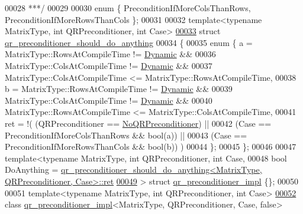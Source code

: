 \begin{DoxyCode}
00028 \textcolor{comment}{ ***/}
00029 
00030 \textcolor{keyword}{enum} \{ PreconditionIfMoreColsThanRows, PreconditionIfMoreRowsThanCols \};
00031 
00032 \textcolor{keyword}{template}<\textcolor{keyword}{typename} MatrixType, \textcolor{keywordtype}{int} QRPreconditioner, \textcolor{keywordtype}{int} Case>
\hyperlink{struct_eigen_1_1internal_1_1qr__preconditioner__should__do__anything}{00033} \textcolor{keyword}{struct }\hyperlink{struct_eigen_1_1internal_1_1qr__preconditioner__should__do__anything}{qr\_preconditioner\_should\_do\_anything}
00034 \{
00035   \textcolor{keyword}{enum} \{ a = MatrixType::RowsAtCompileTime != \hyperlink{namespace_eigen_ad81fa7195215a0ce30017dfac309f0b2}{Dynamic} &&
00036              MatrixType::ColsAtCompileTime != \hyperlink{namespace_eigen_ad81fa7195215a0ce30017dfac309f0b2}{Dynamic} &&
00037              MatrixType::ColsAtCompileTime <= MatrixType::RowsAtCompileTime,
00038          b = MatrixType::RowsAtCompileTime != \hyperlink{namespace_eigen_ad81fa7195215a0ce30017dfac309f0b2}{Dynamic} &&
00039              MatrixType::ColsAtCompileTime != \hyperlink{namespace_eigen_ad81fa7195215a0ce30017dfac309f0b2}{Dynamic} &&
00040              MatrixType::RowsAtCompileTime <= MatrixType::ColsAtCompileTime,
00041          ret = !( (QRPreconditioner == \hyperlink{group__enums_gga46eba0d5c621f590b8cf1b53af31d56ea4d4b44de7ac7f4e623309be035d287d0}{NoQRPreconditioner}) ||
00042                   (Case == PreconditionIfMoreColsThanRows && \textcolor{keywordtype}{bool}(a)) ||
00043                   (Case == PreconditionIfMoreRowsThanCols && \textcolor{keywordtype}{bool}(b)) )
00044   \};
00045 \};
00046 
00047 \textcolor{keyword}{template}<\textcolor{keyword}{typename} MatrixType, \textcolor{keywordtype}{int} QRPreconditioner, \textcolor{keywordtype}{int} Case,
00048          \textcolor{keywordtype}{bool} DoAnything = 
      \hyperlink{struct_eigen_1_1internal_1_1qr__preconditioner__should__do__anything}{qr\_preconditioner\_should\_do\_anything<MatrixType, QRPreconditioner, Case>::ret}
\hyperlink{struct_eigen_1_1internal_1_1qr__preconditioner__impl}{00049} > \textcolor{keyword}{struct }\hyperlink{struct_eigen_1_1internal_1_1qr__preconditioner__impl}{qr\_preconditioner\_impl} \{\};
00050 
00051 \textcolor{keyword}{template}<\textcolor{keyword}{typename} MatrixType, \textcolor{keywordtype}{int} QRPreconditioner, \textcolor{keywordtype}{int} Case>
\hyperlink{class_eigen_1_1internal_1_1qr__preconditioner__impl_3_01_matrix_type_00_01_q_r_preconditioner_00_01_case_00_01false_01_4}{00052} \textcolor{keyword}{class }\hyperlink{struct_eigen_1_1internal_1_1qr__preconditioner__impl}{qr\_preconditioner\_impl}<MatrixType, QRPreconditioner, Case, false>

\end{DoxyCode}

